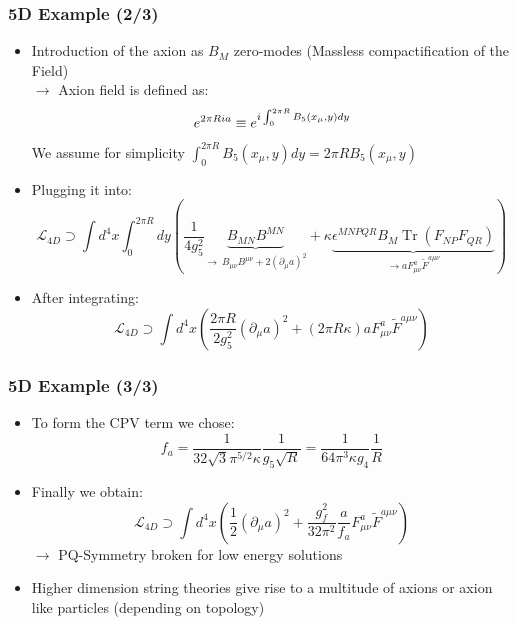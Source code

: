 \documentclass[aspectratio=1610, 9pt]{beamer}
\DeclareMathOperator{\Tr}{Tr}
\begin{document}
\begin{frame}
	\frametitle{5D Example (2/3)}
		\begin{itemize}
			\item Introduction of the axion as $B_M$ zero-modes (Massless compactification of the Field)\\
			$\rightarrow$ Axion field is defined as: 
			\begin{equation*}
				{\Large e^{2\pi R i a} \equiv e^{i\int_{0}^{2\pi R}B_5(x_\mu, y)dy}}
			\end{equation*}
			We assume for simplicity $\int_{0}^{2\pi R}B_5(x_\mu, y)dy = 2\pi RB_5(x_\mu, y)$
			\item Plugging it into:
			\begin{equation*}
				\mathcal{L}_{4D} \supset \int d^4x \int_0^{2\pi R} dy \left( \frac{1}{4 g_5^2} \underbrace{B_{MN} B^{MN}}_{\rightarrow\ B_{\mu\nu}B^{\mu\nu} + 2(\partial_\mu a)^2} + \kappa \underbrace{\epsilon^{MNPQR} B_M \Tr(F_{NP} F_{QR})}_{\rightarrow aF_{\mu\nu}^a \tilde{F}^{a\mu\nu}} \right)
			\end{equation*}
			\item After integrating:
			\begin{equation*}
				\mathcal{L}_{4D} \supset \int d^4x \left( \frac{2\pi R}{2g_5^2} (\partial_\mu a)^2 + (2\pi R \kappa) a F_{\mu\nu}^a \tilde{F}^{a\mu\nu} \right)
			\end{equation*}
		\end{itemize}
\end{frame}

\begin{frame}
	\frametitle{5D Example (3/3)}
	\begin{itemize}
		\item To form the CPV term we chose:
		\begin{equation*}
			f_a = \frac{1}{32 \sqrt{3} \pi^{5/2} \kappa} \frac{1}{g_5 \sqrt{R}} = \frac{1}{64 \pi^3 \kappa g_4} \frac{1}{R}
		\end{equation*}
		\item Finally we obtain:
		\begin{equation*}
			\mathcal{L}_{4D} \supset \int d^4x \left( \frac{1}{2} (\partial_\mu a)^2 + \frac{g_f^2}{32 \pi^2} \frac{a}{f_a} F_{\mu\nu}^a \tilde{F}^{a\mu\nu} \right)
		\end{equation*}
		$\rightarrow$ PQ-Symmetry broken for low energy solutions
    \item Higher dimension string theories give rise to a multitude of axions or axion like particles (depending on topology)
	\end{itemize}
\end{frame}
\end{document}
